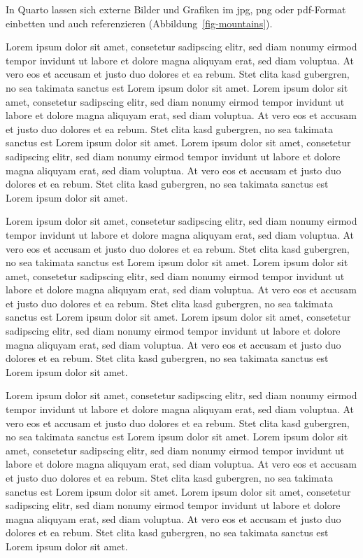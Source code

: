 \documentclass[
  11pt,
  a4paper,
]{tudscrreprt}
\begin{document}
In Quarto lassen sich externe Bilder und Grafiken im jpg, png oder
pdf-Format einbetten und auch referenzieren
(Abbildung~\ref{fig-mountains}).

Lorem ipsum dolor sit amet, consetetur sadipscing elitr, sed diam nonumy
eirmod tempor invidunt ut labore et dolore magna aliquyam erat, sed diam
voluptua. At vero eos et accusam et justo duo dolores et ea rebum. Stet
clita kasd gubergren, no sea takimata sanctus est Lorem ipsum dolor sit
amet. Lorem ipsum dolor sit amet, consetetur sadipscing elitr, sed diam
nonumy eirmod tempor invidunt ut labore et dolore magna aliquyam erat,
sed diam voluptua. At vero eos et accusam et justo duo dolores et ea
rebum. Stet clita kasd gubergren, no sea takimata sanctus est Lorem
ipsum dolor sit amet. Lorem ipsum dolor sit amet, consetetur sadipscing
elitr, sed diam nonumy eirmod tempor invidunt ut labore et dolore magna
aliquyam erat, sed diam voluptua. At vero eos et accusam et justo duo
dolores et ea rebum. Stet clita kasd gubergren, no sea takimata sanctus
est Lorem ipsum dolor sit amet.

Lorem ipsum dolor sit amet, consetetur sadipscing elitr, sed diam nonumy
eirmod tempor invidunt ut labore et dolore magna aliquyam erat, sed diam
voluptua. At vero eos et accusam et justo duo dolores et ea rebum. Stet
clita kasd gubergren, no sea takimata sanctus est Lorem ipsum dolor sit
amet. Lorem ipsum dolor sit amet, consetetur sadipscing elitr, sed diam
nonumy eirmod tempor invidunt ut labore et dolore magna aliquyam erat,
sed diam voluptua. At vero eos et accusam et justo duo dolores et ea
rebum. Stet clita kasd gubergren, no sea takimata sanctus est Lorem
ipsum dolor sit amet. Lorem ipsum dolor sit amet, consetetur sadipscing
elitr, sed diam nonumy eirmod tempor invidunt ut labore et dolore magna
aliquyam erat, sed diam voluptua. At vero eos et accusam et justo duo
dolores et ea rebum. Stet clita kasd gubergren, no sea takimata sanctus
est Lorem ipsum dolor sit amet.

Lorem ipsum dolor sit amet, consetetur sadipscing elitr, sed diam nonumy
eirmod tempor invidunt ut labore et dolore magna aliquyam erat, sed diam
voluptua. At vero eos et accusam et justo duo dolores et ea rebum. Stet
clita kasd gubergren, no sea takimata sanctus est Lorem ipsum dolor sit
amet. Lorem ipsum dolor sit amet, consetetur sadipscing elitr, sed diam
nonumy eirmod tempor invidunt ut labore et dolore magna aliquyam erat,
sed diam voluptua. At vero eos et accusam et justo duo dolores et ea
rebum. Stet clita kasd gubergren, no sea takimata sanctus est Lorem
ipsum dolor sit amet. Lorem ipsum dolor sit amet, consetetur sadipscing
elitr, sed diam nonumy eirmod tempor invidunt ut labore et dolore magna
aliquyam erat, sed diam voluptua. At vero eos et accusam et justo duo
dolores et ea rebum. Stet clita kasd gubergren, no sea takimata sanctus
est Lorem ipsum dolor sit amet.
\end{document}
